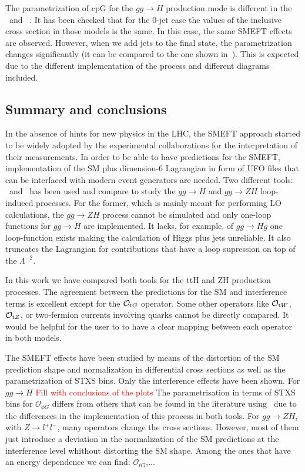     
The parametrization of cpG for the $gg\to H$ production mode is different in the \SMEFTsim\ and \SMEFTatNLO\ . It has been checked that for the 0-jet case the values of the inclusive cross section in those models is the same. In this case, the same SMEFT effects are observed. However, when we add jets to the final state, the parametrization changes significantly (it can be compared to the one shown in~\cite{ATL-PHYS-PUB-2019-042}). This is expected due to the different implementation of the process and different diagrams included.


\subsection{Summary and conclusions}
In the absence of hints for new physics in the LHC, the SMEFT approach started to be widely adopted by the experimental collaborations for the interpretation of their measurements. In order to be able to have predictions for the SMEFT, implementation of the SM plus dimension-6 Lagrangian in form of UFO files that can be interfaced with modern event generators are needed. Two different tools: \SMEFTsim\ and \SMEFTatNLO\ has been used and compare to study the $gg\to H$ and $gg\to ZH$ loop-induced processes. For the former, which is mainly meant for performing LO calculations, the $gg\to ZH$ process cannot be simulated and only one-loop functions for $gg\to H$ are implemented. It lacks, for example, of $gg\to Hg$ one loop-function exists making the calculation of Higgs plus jets unreliable. It also truncates the Lagrangian for contributions that have a loop supression on top of the $\Lambda^{-2}$.

In this work we have compared both tools for the ttH and ZH production processes. The agreement between the predictions for the SM and interference terms is excellent except for the $\mathcal{O}_{\textrm tG}$ operator. Some other operators like $\mathcal{O}_{\textrm tW}$, $\mathcal{O}_{\textrm tZ}$, or two-fermion currents involving quarks cannot be directly compared. It would be helpful for the user to to have a clear mapping between each operator in both models.

The SMEFT effects have been studied by means of the distortion of the SM prediction shape and normalization in differential cross sections as well as the parametrization of STXS bins. Only the interference effects have been shown. For $gg\to H$
\textcolor{red}{Fill with conclusions of the plots}
The parametrisation in terms of STXS bins for $\mathcal{O}_{\phi G}$ differs from others that can be found in the literature using \SMEFTsim\ due to the differences in the implementation of this process in both tools.
For $gg\to ZH$, with $Z\to l^{+}l^{-}$,  many operators change the cross sections. However, most of them just introduce a deviation in the normalization of the SM predictions at the interference level whithout distorting the SM shape. Among the ones that have an energy dependence we can find: $\mathcal{O}_{tG}$,...

